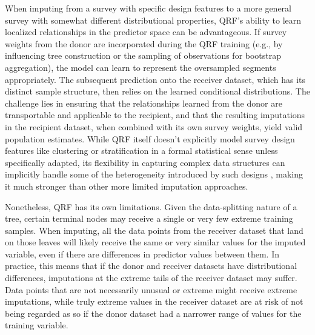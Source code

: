 When imputing from a survey with specific design features to a more general survey with somewhat different distributional properties, QRF's ability to learn localized relationships in the predictor space can be advantageous. If survey weights from the donor are incorporated during the QRF training (e.g., by influencing tree construction or the sampling of observations for bootstrap aggregation), the model can learn to represent the oversampled segments appropriately. The subsequent prediction onto the receiver dataset, which has its distinct sample structure, then relies on the learned conditional distributions. The challenge lies in ensuring that the relationships learned from the donor are transportable and applicable to the recipient, and that the resulting imputations in the recipient dataset, when combined with its own survey weights, yield valid population estimates. While QRF itself doesn't explicitly model survey design features like clustering or stratification in a formal statistical sense unless specifically adapted, its flexibility in capturing complex data structures can implicitly handle some of the heterogeneity introduced by such designs \citep{hao2007quantile}, making it much stronger than other more limited imputation approaches.

Nonetheless, QRF has its own limitations. Given the data-splitting nature of a tree, certain terminal nodes may receive a single or very few extreme training samples. When imputing, all the data points from the receiver dataset that land on those leaves will likely receive the same or very similar values for the imputed variable, even if there are differences in predictor values between them. In practice, this means that if the donor and receiver datasets have distributional differences, imputations at the extreme tails of the receiver dataset may suffer. Data points that are not necessarily unusual or extreme might receive extreme imputations, while truly extreme values in the receiver dataset are at risk of not being regarded as so if the donor dataset had a narrower range of values for the training variable.